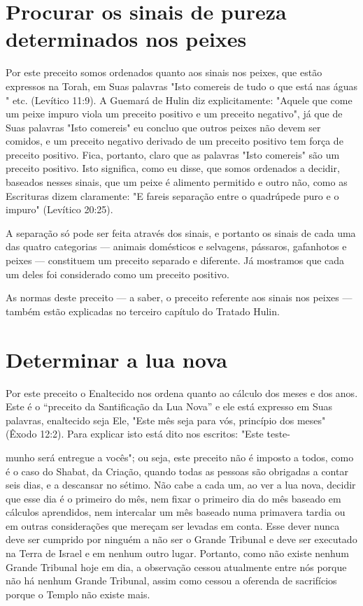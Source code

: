 \section{Procurar os sinais de pureza determinados nos peixes}


Por este preceito somos ordenados quanto aos sinais nos peixes, que
estão expressos na Torah, em Suas palavras "Isto comereis de tudo o que
está nas águas " etc. (Levítico 11:9). A Guemará de Hulin diz
explicitamente: "Aquele que come um peixe impuro viola um preceito
positivo e um preceito negati­vo", já que de Suas palavras "Isto
comereis" eu concluo que outros peixes não devem ser comidos, e um
preceito negativo derivado de um preceito positivo tem força de preceito
positivo. Fica, portanto, claro que as palavras "Isto co­mereis" são um
preceito positivo. Isto significa, como eu disse, que somos or­denados a
decidir, baseados nesses sinais, que um peixe é alimento permitido e
outro não, como as Escrituras dizem claramente: "E fareis separação
entre o quadrúpede puro e o impuro" (Levítico 20:25).

A separação só pode ser feita através dos sinais, e portanto os sinais
de cada uma das quatro categorias --- animais domésticos e selvagens,
pássaros, gafanhotos e peixes --- constituem um preceito separado e
diferente. Já mostra­mos que cada um deles foi considerado como um
preceito positivo.

As normas deste preceito --- a saber, o preceito referente aos sinais
nos peixes --- também estão explicadas no terceiro capítulo do Tratado
Hulin.

\section{Determinar a lua nova}

Por este preceito o Enaltecido nos ordena quanto ao cálculo dos me­ses e
dos anos. Este é o ``preceito da Santificação da Lua Nova'' e ele está
ex­presso em Suas palavras, enaltecido seja Ele, "Este mês seja para
vós, princípio dos meses" (Êxodo 12:2). Para explicar isto está dito nos
escritos: "Este teste-



munho será entregue a vocês"; ou seja, este preceito não é imposto a
todos, como é o caso do Shabat, da Criação, quando todas as pessoas são
obrigadas a contar seis dias, e a descansar no sétimo. Não cabe a cada
um, ao ver a lua nova, decidir que esse dia é o primeiro do mês, nem
fixar o primeiro dia do mês baseado em cálculos aprendidos, nem
intercalar um mês baseado numa primavera tardia ou em outras
considerações que mereçam ser levadas em con­ta. Esse dever nunca deve
ser cumprido por ninguém a não ser o Grande Tri­bunal e deve ser
executado na Terra de Israel e em nenhum outro lugar. Por­tanto, como
não existe nenhum Grande Tribunal hoje em dia, a observação cessou
atualmente entre nós porque não há nenhum Grande Tribunal, assim como
cessou a oferenda de sacrifícios porque o Templo não existe mais.

